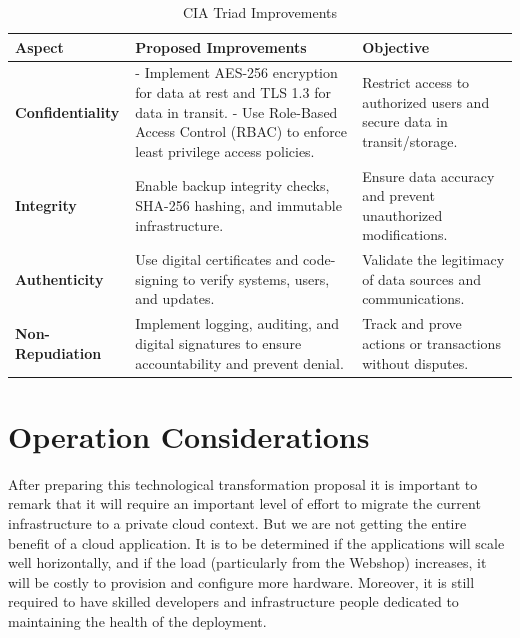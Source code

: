 \documentclass{llncs}
\begin{document}
\begin{table}[tbph]
  \centering
  \begin{tabular}{|p{3cm}|p{5cm}|p{5cm}|}
    \hline
    \textbf{Aspect} & \textbf{Proposed Improvements}                                                                     & \textbf{Objective} \\ \hline
    \textbf{Confidentiality}
                    & - Implement AES-256 encryption for data at rest and TLS 1.3 for data in transit. \newline
    - Use Role-Based Access Control (RBAC) to enforce least privilege access policies. 
                    & Restrict access to authorized users and secure data in transit/storage.                                                 \\ \hline
    \textbf{Integrity}
                    & Enable backup integrity checks, SHA-256 hashing, and immutable infrastructure. 
                    & Ensure data accuracy and prevent unauthorized modifications.                                                            \\ \hline
    \textbf{Authenticity}
                    & Use digital certificates and code-signing to verify systems, users, and updates. 
                    & Validate the legitimacy of data sources and communications.                                                             \\ \hline
    \textbf{Non-Repudiation}
                    & Implement logging, auditing, and digital signatures to ensure accountability and prevent denial. 
                    & Track and prove actions or transactions without disputes.                                                               \\ \hline
  \end{tabular}
  \caption{CIA Triad Improvements}
  \label{tab:cia-triad}
\end{table}



\section{Operation Considerations}

After preparing this technological transformation proposal it is important to remark that it will require an important level of effort to migrate the current infrastructure to a private cloud context. But we are not getting the entire benefit of a cloud application. It is to be determined if the applications will scale well horizontally, and if the load (particularly from the Webshop) increases, it will be costly to provision and configure more hardware. Moreover, it is still required to have skilled developers and infrastructure people dedicated to maintaining the health of the deployment.  
\end{document}

